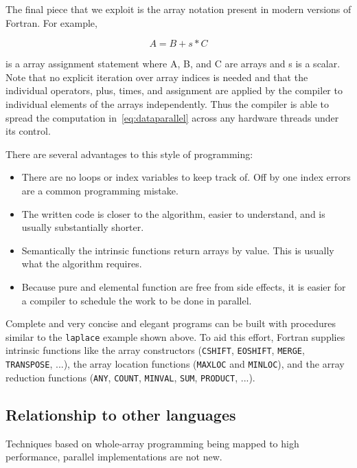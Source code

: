\documentclass[10pt, conference, compsocconf]{IEEEtran}
\begin{document}
The final piece that we exploit is the array notation present in modern
versions of Fortran.  For example,

\begin{equation}
\label{eq:dataparallel}
A = B + s * C
\end{equation}

is a array assignment statement where A, B, and C are arrays and s is a
scalar.  Note that no explicit iteration over array indices is needed and that
the individual operators, plus, times, and assignment are applied by the
compiler to individual elements of the arrays independently.  Thus the
compiler is able to spread the computation in~\ref{eq:dataparallel} across any
hardware threads under its control.

There are several advantages to this style of programming:

\begin{itemize}
	\item There are no loops or index variables to keep track of.  Off by one
index errors are a common programming mistake.
        \item The written code is closer to the algorithm, easier to understand, and is usually substantially shorter.
	\item Semantically the intrinsic functions return arrays by value.  This is usually what the algorithm requires.
	\item Because pure and elemental function are free from side effects, it is easier for a compiler to schedule the work to be done in parallel.
\end{itemize}

Complete and very concise and elegant programs can be built with procedures
similar to the {\tt laplace} example shown above. To aid this effort, Fortran
supplies intrinsic functions like the array constructors (\texttt{CSHIFT},
\texttt{EOSHIFT}, \texttt{MERGE}, \texttt{TRANSPOSE}, ...), the array location
functions (\texttt{MAXLOC} and \texttt{MINLOC}), and the array reduction
functions (\texttt{ANY}, \texttt{COUNT}, \texttt{MINVAL}, \texttt{SUM},
\texttt{PRODUCT}, ...).


\subsection{Relationship to other languages}

Techniques based on whole-array programming being mapped to high performance,
parallel implementations are not new.  
\end{document}
